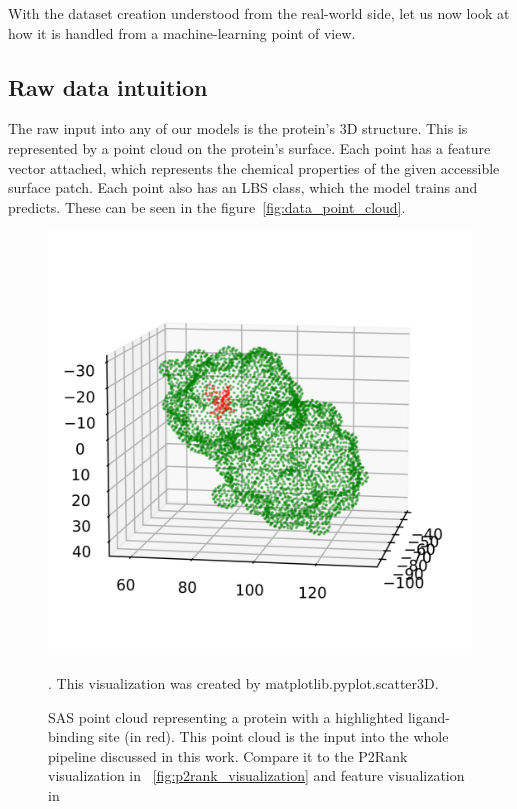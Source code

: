 With the dataset creation understood from the real-world side, let us now look at how it is handled from a machine-learning point of view. 

\subsection{Raw data intuition}

The raw input into any of our models is the protein's 3D structure. This is represented by a point cloud on the protein's surface. Each point has a feature vector attached, which represents the chemical properties of the given accessible surface patch. Each point also has an LBS class, which the model trains and predicts. These can be seen in the figure~\ref{fig:data_point_cloud}.

\begin{figure}
    \centering
    \includegraphics[width=1\linewidth]{point_cloud_class.png}
    \caption{SAS point cloud representing a protein with a highlighted ligand-binding site (in red). This point cloud is the input into the whole pipeline discussed in this work. Compare it to the P2Rank visualization in ~\ref{fig:p2rank_visualization} and feature visualization in }
    \label{fig:pca_point_cloud}. This visualization was created by matplotlib.pyplot.scatter3D.
\end{figure}

